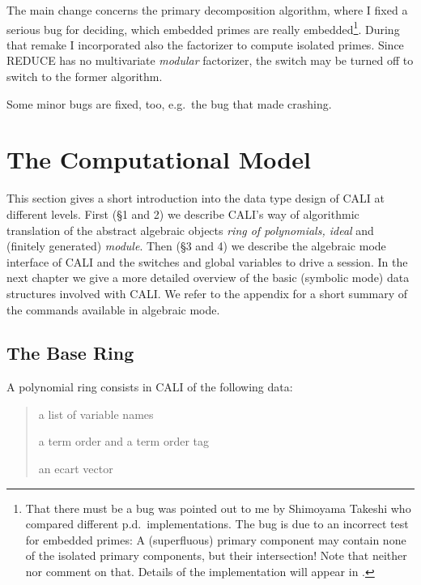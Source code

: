 The main change concerns the primary decomposition algorithm, where I
fixed a serious bug for deciding, which embedded primes are really
embedded\footnote{That there must be a bug was pointed out to me by
Shimoyama Takeshi who compared different p.d.\ implementations. The
bug is due to an incorrect test for embedded primes: A (superfluous)
primary component may contain none of the isolated primary components,
but their intersection! Note that neither \cite{GTZ} nor \cite{BKW}
comment on that. Details of the implementation will appear in
\cite{primary}.}. During that remake I incorporated also the \gr
factorizer to compute isolated primes. Since REDUCE has no
multivariate {\em modular} factorizer, the switch 
may be turned off to switch to the former algorithm.



Some minor bugs are fixed, too, e.g.\ the bug that made 
crashing. 




\section{The Computational Model}

This section gives a short introduction into the data type design of
CALI at different levels. First (\S 1 and 2) we describe CALI's way
of algorithmic translation of the abstract algebraic objects {\em
ring of polynomials, ideal} and (finitely generated) {\em module}.
Then (\S 3 and 4) we describe the algebraic mode interface of CALI
and the switches and global variables to drive a session. In the next
chapter we give a more detailed overview of the basic (symbolic mode) data
structures involved with CALI. We refer to the appendix for a short
summary of the commands available in algebraic mode.

\subsection{The Base Ring}

A polynomial ring consists in CALI of the following data:
\begin{quote}
a list of variable names 


a term order and a term order tag


an ecart vector

\end{quote}

